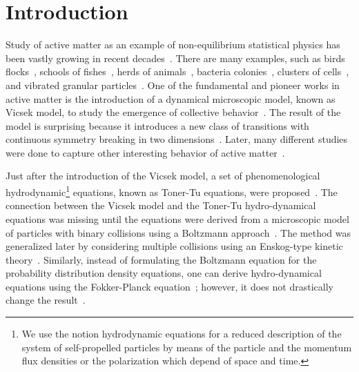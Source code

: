 \documentclass[reprint,floatfix,amsmath,amssymb,aps,pre,showkeys,showpacs,superscriptaddress]{revtex4-1}
\newcommand{\hl}[1]{\textcolor{hlcolor}{#1}}
\begin{document}
\maketitle

\section{Introduction}

Study of active matter as an example of non-equilibrium statistical physics has been vastly growing in recent decades~\cite{marchetti,Vicsek2012,Redner2013structure,cates2014,caussin2014,Weber2015random,Solon2015,Ginot2015nonequilibrium,Battle2016broken,Menzel2016on}. There are many examples, such as birds flocks~\cite{Biro2006,Nagy2010,Attanasi2014information,Cavagna2015silent,Cavagna2015flocking}, schools of fishes~\cite{Makris2006,Becco2006,Lopez2012from}, herds of animals~\cite{ginelli2015,toulet2015}, bacteria colonies~\cite{Dombrowski2004self,Sokolov2007concentration,peruani2012}, clusters of cells~\cite{Segerer2015emergence}, and vibrated granular particles~\cite{Narayan2007,kumar2014flocking}. One of the  fundamental and pioneer works in active matter is the introduction of a dynamical microscopic model, known as Vicsek model, to study the emergence of collective behavior~\cite{Vicsek1995}. The result of the model is surprising because it introduces a new class of transitions with continuous symmetry breaking in two dimensions~\cite{chepizhko2013,weitz2015}. Later, many different studies were done to capture other interesting behavior of active matter~\cite{Vicsek1995,Shimoyama1996,Czirok1997,Chate2008a, Peruani2011polar,Farrell2012,solon2013,Weber2014defect,Fily2015dynamics,Bratanov2015new,Chepizhko2015active,nagia2015collective,Grossmann2016superdiffusion,denk2016active}.




Just after the introduction of \hl{the} Vicsek model, a set of phenomenological hydrodynamic\hl{\footnote{We use the notion hydrodynamic equations for a reduced description of the system of self-propelled particles by means of the particle and the momentum flux densities or  the polarization which depend of space and time.}} equations,  known as \hl{Toner}-Tu equations, were proposed~\cite{Toner1995}. The connection between the Vicsek model and the \hl{Toner}-Tu hydro-dynamical equations was missing until the equations were derived from a microscopic model of particles with binary collisions using \hl{a} Boltzmann approach~\cite{Bertin2006,Bertin2009,Peshkov2012,Peshkov2012continuous}. The method was generalized later by considering multiple collisions using \hl{an} Enskog-type kinetic theory~\cite{ihle2011kinetic,Chou2012kinetic,Ihle2014toward,Ihle2015large}. Similarly, instead of \hl{formulating the Boltzmann equation for the probability distribution density} equations, one can derive hydro-dynamical equations using the \hl{Fokker-Planck} equation~\cite{Baskaran2008,Farrell2012,Grossmann2013}; however, it does not drastically change the result~\cite{Bertin2015}.
\end{document}
